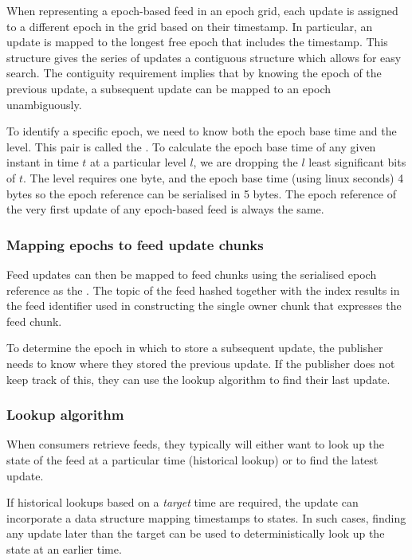 When representing a epoch-based feed in an epoch grid, each update is assigned to a different epoch in the grid based on their timestamp. In particular, an update is mapped to the longest free epoch that includes the timestamp. This structure gives the series of updates a contiguous structure which allows for easy search. The contiguity requirement implies that by knowing the epoch of the previous update, a subsequent update can be mapped to an epoch unambiguously.


To identify a specific epoch, we need to know both the epoch base time and the level. This pair is called the  . To calculate the epoch base time of any given instant in time $t$ at a particular level $l$, we are dropping the $l$ least significant bits of $t$. 
The level requires one byte, and the epoch base time (using linux seconds) 4 bytes so the epoch reference can be serialised in 5 bytes. 
The epoch reference of the very first update of any epoch-based feed is always the same.

\subsubsection{Mapping epochs to feed update chunks}

Feed updates can then be mapped to feed chunks using the serialised epoch reference as the . The topic of the feed hashed together with the index results in the feed identifier used in constructing the single owner chunk that expresses the feed chunk. 

To determine the epoch in which to store a subsequent update, the publisher needs to know where they stored the previous update. If the publisher does not keep track of this, they can use the lookup algorithm to find their last update.



\subsubsection{Lookup algorithm}

When consumers retrieve feeds, they typically will either want to look up the state of the feed at a particular time (historical lookup) or to find the latest update.

If historical lookups based on a \emph{target} time are required, the update can incorporate a data structure mapping timestamps to states. In such cases, finding any update later than the target can be used to deterministically look up the state at an earlier time. 

